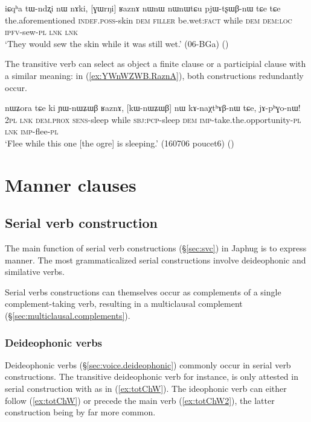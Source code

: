 \begin{exe}
\ex \label{ex:GWrNi.RaznA}
\gll iɕqʰa tɯ-ndʐi nɯ nɤki, [ɣɯrŋi] ʁaznɤ nɯnɯ nɯnɯtɕu pjɯ-tʂɯβ-nɯ tɕe tɕe \\
the.aforementioned \textsc{indef}.\textsc{poss}-skin \textsc{dem} \textsc{filler} be.wet:\textsc{fact} while \textsc{dem} \textsc{dem}:\textsc{loc} \textsc{ipfv}-sew-\textsc{pl} \textsc{lnk} \textsc{lnk} \\
\glt `They would sew the skin while it was still wet.' (06-BGa)
()
\end{exe}

The transitive verb  can select as object a finite clause or a participial clause with a similar meaning: in  (\ref{ex:YWnWZWB.RaznA}), both constructions redundantly occur. 

\begin{exe}
\ex \label{ex:YWnWZWB.RaznA}
\gll  nɯʑora tɕe ki ɲɯ-nɯʑɯβ ʁaznɤ, [kɯ-nɯʑɯβ] nɯ kɤ-naχtʰɤβ-nɯ tɕe, jɤ-pʰɣo-nɯ! \\
\textsc{2pl} \textsc{lnk} \textsc{dem}.\textsc{prox} \textsc{sens}-sleep while \textsc{sbj}:\textsc{pcp}-sleep \textsc{dem} \textsc{imp}-take.the.opportunity-\textsc{pl} \textsc{lnk} \textsc{imp}-flee-\textsc{pl} \\
\glt `Flee while this one [the ogre] is sleeping.' (160706 poucet6)
()
\end{exe}
 


\section{Manner clauses} \label{sec:manner.clauses}

\subsection{Serial verb construction} \label{sec:svc.manner}
The main function of serial verb constructions (§\ref{sec:svc}) in Japhug is to express manner. The most grammaticalized serial constructions involve deideophonic and similative verbs.


Serial verbs constructions can themselves occur as complements of a single com\-ple\-ment-taking verb, resulting in a multiclausal complement (§\ref{sec:multiclausal.complements}).

\subsubsection{Deideophonic verbs} \label{sec:svc.deideophonic}
Deideophonic verbs (§\ref{sec:voice.deideophonic}) commonly occur in serial verb constructions. The transitive deideophonic verb  for instance, is only attested in serial construction with  as in (\ref{ex:totChW}). The ideophonic verb can either follow (\ref{ex:totChW}) or precede the main verb (\ref{ex:totChW2}), the latter construction being by far more common. 

